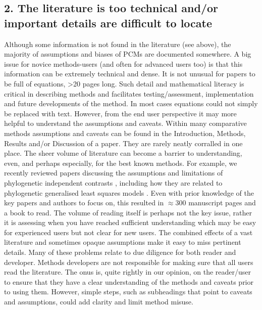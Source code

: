 \documentclass[a4paper,12pt]{article}
\begin{document}
  \subsection{2. The literature is too technical and/or important details are difficult to locate}
    Although some information is not found in the literature (see above), the majority of assumptions and biases of PCMs are documented somewhere. 
    A big issue for novice methods-users (and often for advanced users too) is that this information can be extremely technical and dense.
    It is not unusual for papers to be full of equations, \textgreater 20 pages long. 
    Such detail and mathematical literacy is critical in describing methods and facilitates testing/assessment, implementation and future developments of the method.
    In most cases equations could not simply be replaced with text.
   However, from the end user perspective it may more helpful to understand the assumptions and caveats.
   Within many comparative methods assumptions and caveats can be found in the Introduction, Methods, Results and/or Discussion of a paper. 
    They are rarely neatly corralled in one place.
     The sheer volume of literature can become a barrier to understanding, even, and perhaps especially, for the best known methods.
     For example, we recently reviewed papers discussing the assumptions and limitations of phylogenetic independent contrasts \citep{felsenstein1985phylogenies}, including how they are related to phylogenetic generalised least squares models \citep{garland2000using,rohle2006comment,blomberg2012independent}. 
    Even with prior knowledge of the key papers and authors to focus on, this resulted in $\approx 300$ manuscript pages and a book to read.
    The volume of reading itself is perhaps not the key issue, rather it is assessing when you have reached sufficient understanding which may be easy for experienced users but not clear for new users.    
    The combined effects of a vast literature and sometimes opaque assumptions make it easy to miss pertinent details.
    Many of these problems relate to due diligence for both reader and developer. 
    Methods developers are not responsible for making sure that all users read the literature. 
    The onus is, quite rightly in our opinion, on the reader/user to ensure that they have a clear understanding of the methods and caveats prior to using them. 
    However, simple steps, such as subheadings that point to caveats and assumptions, could add clarity and limit method misuse. 
\end{document}
